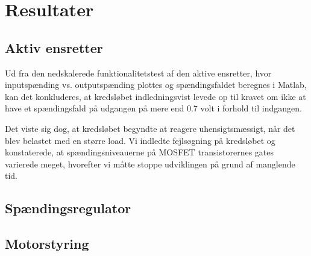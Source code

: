 

\clearpage
\chapter{Resultater}
\label{sec:resultater}

\section{Aktiv ensretter}
\label{sec:aktiv-ensretter}

Ud fra den nedskalerede funktionalitetstest af den aktive ensretter, hvor inputspænding vs. outputspænding plottes og spændingsfaldet beregnes i Matlab, kan det konkluderes, at kredsløbet indledningsvist levede op til kravet om ikke at have et spændingsfald på udgangen på mere end 0.7 volt i forhold til indgangen. 

Det viste sig dog, at kredsløbet begyndte at reagere uhensigtsmæssigt, når det blev belastet med en større load. Vi indledte fejlsøgning på kredsløbet og konstaterede, at spændingsniveauerne på MOSFET transistorernes gates varierede meget, hvorefter vi måtte stoppe udviklingen på grund af manglende tid.  

\section{Spændingsregulator}
\label{sec:spandingsregulator}





\section{Motorstyring}
\label{sec:motorstyring-2} 

